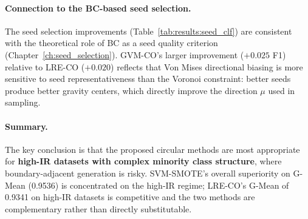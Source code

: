 \paragraph{Connection to the BC-based seed selection.}
The seed selection improvements (Table~\ref{tab:results:seed_clf}) are consistent with the theoretical role of BC as a seed quality criterion (Chapter~\ref{ch:seed_selection}).
GVM-CO's larger improvement ($+0.025$ F1) relative to LRE-CO ($+0.020$) reflects that Von Mises directional biasing is more sensitive to seed representativeness than the Voronoi constraint: better seeds produce better gravity centers, which directly improve the direction $\mu$ used in sampling.

\paragraph{Summary.}
The key conclusion is that the proposed circular methods are most appropriate for \textbf{high-IR datasets with complex minority class structure}, where boundary-adjacent generation is risky.
SVM-SMOTE's overall superiority on G-Mean (0.9536) is concentrated on the high-IR regime; LRE-CO's G-Mean of 0.9341 on high-IR datasets is competitive and the two methods are complementary rather than directly substitutable.
